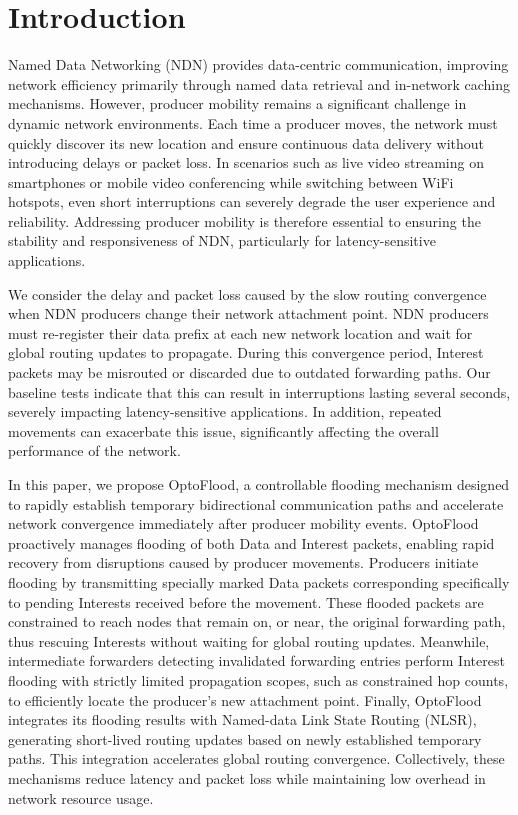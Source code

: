 \documentclass[conference]{IEEEtran}
\begin{document}
\section{Introduction} \label{sec:introduction}

Named Data Networking (NDN) provides data-centric communication, improving network efficiency primarily through named data retrieval and in-network caching mechanisms. However, producer mobility remains a significant challenge in dynamic network environments. Each time a producer moves, the network must quickly discover its new location and ensure continuous data delivery without introducing delays or packet loss. In scenarios such as live video streaming on smartphones or mobile video conferencing while switching between WiFi hotspots, even short interruptions can severely degrade the user experience and reliability. Addressing producer mobility is therefore essential to ensuring the stability and responsiveness of NDN, particularly for latency-sensitive applications.

We consider the delay and packet loss caused by the slow routing convergence when NDN producers change their network attachment point. NDN producers must re-register their data prefix at each new network location and wait for global routing updates to propagate. During this convergence period, Interest packets may be misrouted or discarded due to outdated forwarding paths. Our baseline tests indicate that this can result in interruptions lasting several seconds, severely impacting latency-sensitive applications. In addition, repeated movements can exacerbate this issue, significantly affecting the overall performance of the network.

In this paper, we propose OptoFlood, a controllable flooding mechanism designed to rapidly establish temporary bidirectional communication paths and accelerate network convergence immediately after producer mobility events. OptoFlood proactively manages flooding of both Data and Interest packets, enabling rapid recovery from disruptions caused by producer movements. Producers initiate flooding by transmitting specially marked Data packets corresponding specifically to pending Interests received before the movement. These flooded packets are constrained to reach nodes that remain on, or near, the original forwarding path, thus rescuing Interests without waiting for global routing updates. Meanwhile, intermediate forwarders detecting invalidated forwarding entries perform Interest flooding with strictly limited propagation scopes, such as constrained hop counts, to efficiently locate the producer’s new attachment point. Finally, OptoFlood integrates its flooding results with Named-data Link State Routing (NLSR), generating short-lived routing updates based on newly established temporary paths. This integration accelerates global routing convergence. Collectively, these mechanisms reduce latency and packet loss while maintaining low overhead in network resource usage.
\end{document}
